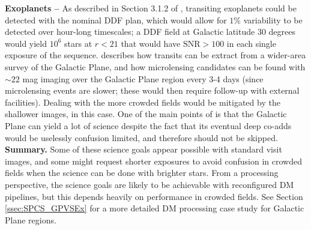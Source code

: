 \documentclass[DM,lsstdoc,toc]{lsstdoc}
\begin{document}
\noindent \textbf{Exoplanets -- } As described in Section 3.1.2 of \citep{2008arXiv0805.2366I}, transiting exoplanets could be detected with the nominal DDF plan, which would allow for $1\%$ variability to be detected over hour-long timescales; a DDF field at Galactic latitude $30$ degrees would yield $10^6$ stars at $r<21$ that would have $\mathrm{SNR}>100$ in each single exposure of the sequence. \citep{2013arXiv1304.3455G} describes how transits can be extract from a wider-area survey of the Galactic Plane, and how microlensing candidates can be found with $\sim22$ mag imaging over the Galactic Plane region every 3-4 days (since microlensing events are slower; these would then require follow-up with external facilities). Dealing with the more crowded fields would be mitigated by the shallower images, in this case. One of the main points of \citep{2013arXiv1304.3455G} is that the Galactic Plane can yield a lot of science despite the fact that its eventual deep co-adds would be uselessly confusion limited, and therefore should not be skipped. \textbf{Summary.} Some of these science goals appear possible with standard visit images, and some might request shorter exposures to avoid confusion in crowded fields when the science can be done with brighter stars. From a processing perspective, the science goals are likely to be achievable with reconfigured DM pipelines, but this depends heavily on performance in crowded fields. See Section \ref{ssec:SPCS_GPVSEx} for a more detailed DM processing case study for Galactic Plane regions.
\end{document}
